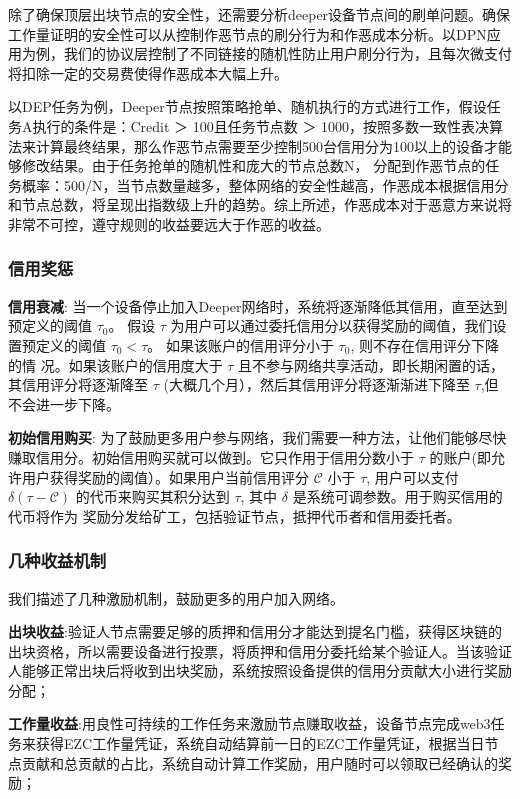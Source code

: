 \documentclass[a4paper]{article}
\begin{document}
除了确保顶层出块节点的安全性，还需要分析deeper设备节点间的刷单问题。确保工作量证明的安全性可以从控制作恶节点的刷分行为和作恶成本分析。以DPN应用为例，我们的协议层控制了不同链接的随机性防止用户刷分行为，且每次微支付将扣除一定的交易费使得作恶成本大幅上升。

以DEP任务为例，Deeper节点按照策略抢单、随机执行的方式进行工作，假设任务A执行的条件是：Credit ＞ 100且任务节点数 ＞ 1000，按照多数一致性表决算法来计算最终结果，那么作恶节点需要至少控制500台信用分为100以上的设备才能够修改结果。由于任务抢单的随机性和庞大的节点总数N，
分配到作恶节点的任务概率：500/N，当节点数量越多，整体网络的安全性越高，作恶成本根据信用分和节点总数，将呈现出指数级上升的趋势。综上所述，作恶成本对于恶意方来说将非常不可控，遵守规则的收益要远大于作恶的收益。

\subsubsection{信用奖惩}

\textbf{信用衰减}: 当一个设备停止加入Deeper网络时，系统将逐渐降低其信用，直至达到预定义的阈值 $\tau_0$。 假设 $\tau$ 为用户可以通过委托信用分以获得奖励的阈值，我们设置预定义的阈值 $\tau_0 < \tau$。 如果该账户的信用评分小于 $\tau_0$, 则不存在信用评分下降的情
况。如果该账户的信用度大于 $\tau$ 且不参与网络共享活动，即长期闲置的话，其信用评分将逐渐降至 $\tau$ (大概几个月），然后其信用评分将逐渐渐进下降至 $\tau$,但不会进一步下降。

\textbf{初始信用购买}: 为了鼓励更多用户参与网络，我们需要一种方法，让他们能够尽快赚取信用分。初始信用购买就可以做到。它只作用于信用分数小于 $\tau$ 的账户(即允许用户获得奖励的阈值）。如果用户当前信用评分 $\mathcal{C}$ 小于 $\tau$, 用户可以支付 $\delta(\tau-\mathcal{C})$ 的代币来购买其积分达到 $\tau$, 其中 $\delta$ 是系统可调参数。用于购买信用的代币将作为 奖励分发给矿工，包括验证节点，抵押代币者和信用委托者。

\subsubsection{几种收益机制}
我们描述了几种激励机制，鼓励更多的用户加入网络。

\textbf{出块收益}:验证人节点需要足够的质押和信用分才能达到提名门槛，获得区块链的出块资格，所以需要设备进行投票，将质押和信用分委托给某个验证人。当该验证人能够正常出块后将收到出块奖励，系统按照设备提供的信用分贡献大小进行奖励分配；

\textbf{工作量收益}:用良性可持续的工作任务来激励节点赚取收益，设备节点完成web3任务来获得EZC工作量凭证，系统自动结算前一日的EZC工作量凭证，根据当日节点贡献和总贡献的占比，系统自动计算工作奖励，用户随时可以领取已经确认的奖励；
\end{document}
